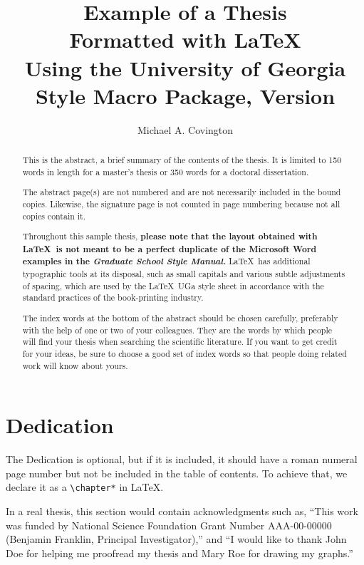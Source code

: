 \documentclass[12pt]{report}
\title{Example of a Thesis\\
       Formatted with LaTeX\\
       Using the University of Georgia\\
       Style Macro Package, Version \ugastyversion}
\author{Michael A. Covington}
\begin{document}

\begin{abstract}
This is the abstract, a brief summary of the contents of the thesis.  It
is limited to 150 words in length for a master's thesis or 350 words for
a doctoral dissertation.

The abstract page(s) are not numbered and are not necessarily included
in the bound copies.  Likewise, the signature page is not counted in
page numbering because not all copies contain it.

Throughout this sample thesis, {\bf please note
that the layout obtained with \LaTeX\ is not meant to be a
perfect duplicate of the Microsoft Word examples in the \emph{Graduate
School Style Manual.}}  \LaTeX\ has additional typographic tools at its
disposal, such as {\sc small capitals} and various subtle adjustments
of spacing, which are used by the \LaTeX\ UGa style sheet in accordance
with the standard practices of the book-printing industry.

The index words at the bottom of the abstract should be chosen carefully,
preferably with the help of one or two of your colleagues.
They are the words by which people will find your thesis when searching
the scientific literature.
If you want to get credit for your ideas, be sure to choose a good set of
index words so that people doing related work will know about yours.
\end{abstract}

\maketitle    %


\chapter*{Dedication}

The Dedication is optional, but if it is included, it should have
a roman numeral page number but not be included in the table of
contents.  To achieve that, we declare it as a \verb"\chapter*" in \LaTeX.



In a real thesis, this section would contain acknowledgments such
as, ``This work was funded by National Science Foundation Grant
Number AAA-00-00000 (Benjamin Franklin, Principal Investigator),''
and ``I would like to thank John Doe for helping me proofread my
thesis and Mary Roe for drawing my graphs.''
\end{document}
